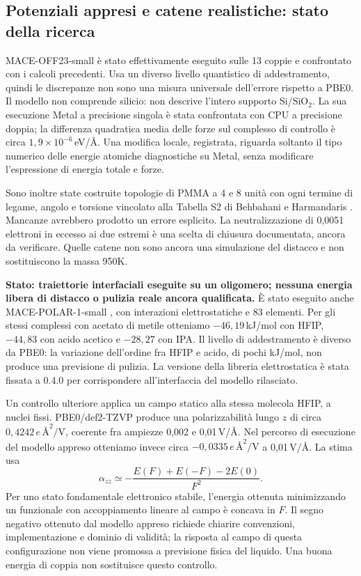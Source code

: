 \documentclass[11pt,reqno]{amsart}
\numberwithin{equation}{section}
\newcommand{\SiO}{\ensuremath{\mathrm{SiO}_2}}
\begin{document}
\subsection{Potenziali appresi e catene realistiche: stato della ricerca}

MACE-OFF23-small \cite{MACE2025} \`e stato effettivamente eseguito
sulle 13 coppie e confrontato con i calcoli precedenti. Usa un diverso
livello quantistico di addestramento, quindi le discrepanze non sono
una misura universale dell'errore rispetto a PBE0. Il modello non
comprende silicio: non descrive l'intero supporto Si/\SiO.
La sua esecuzione Metal a precisione singola \`e stata confrontata
con CPU a precisione doppia; la differenza quadratica media delle
forze sul complesso di controllo \`e circa
$1,9\times10^{-6}$\,eV/\AA. Una modifica locale, registrata,
riguarda soltanto il tipo numerico delle energie atomiche diagnostiche
su Metal, senza modificare l'espressione di energia totale e forze.

Sono inoltre state costruite topologie di PMMA a 4 e 8 unit\`a con
ogni termine di legame, angolo e torsione vincolato alla Tabella S2
di Behbahani e Harmandaris \cite{Behbahani2021}. Mancanze avrebbero
prodotto un errore esplicito. La neutralizzazione di 0,0051 elettroni
in eccesso ai due estremi \`e una scelta di chiusura documentata,
ancora da verificare. Quelle catene non sono ancora una simulazione
del distacco e non sostituiscono la massa 950K.

\textbf{Stato: traiettorie interfaciali eseguite su un oligomero;
nessuna energia libera di distacco o pulizia reale ancora qualificata.}
\`E stato eseguito anche MACE-POLAR-1-small \cite{MACEPolar2026},
con interazioni elettrostatiche e 83 elementi. Per gli stessi complessi
con acetato di metile otteniamo $-46{,}19$\,kJ/mol con HFIP,
$-44{,}83$ con acido acetico e $-28{,}27$ con IPA. Il livello di
addestramento \`e diverso da PBE0: la variazione dell'ordine fra
HFIP e acido, di pochi kJ/mol, non produce una previsione di pulizia.
La versione della libreria elettrostatica \`e stata fissata a 0.4.0
per corrispondere all'interfaccia del modello rilasciato.

Un controllo ulteriore applica un campo statico alla stessa molecola
HFIP, a nuclei fissi. PBE0/def2-TZVP produce una polarizzabilit\`a
lungo $z$ di circa $0{,}4242\,e\,\text{\AA}^2/\mathrm V$, coerente fra
ampiezze 0,002 e 0,01\,V/\AA. Nel percorso di esecuzione del
modello appreso otteniamo invece circa $-0{,}0335\,e\,\text{\AA}^2/\mathrm V$
a 0,01\,V/\AA. La stima usa
\begin{equation}
 \alpha_{zz}\simeq -\frac{E(F)+E(-F)-2E(0)}{F^2}.
\end{equation}
Per uno stato fondamentale elettronico stabile, l'energia ottenuta
minimizzando un funzionale con accoppiamento lineare al campo \`e
concava in $F$. Il segno negativo ottenuto dal modello appreso
richiede chiarire convenzioni, implementazione e dominio di validit\`a;
la risposta al campo di questa configurazione non viene promossa a
previsione fisica del liquido. Una buona energia di coppia non
sostituisce questo controllo.
\end{document}
